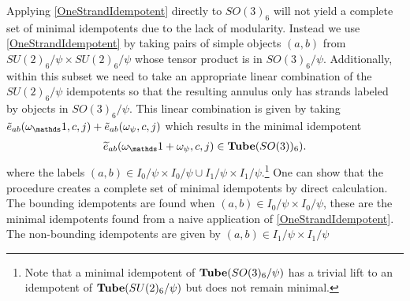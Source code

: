 Applying \eqref{OneStrandIdempotent} directly to $SO(3)_6$ will not yield a complete set of minimal idempotents due to the lack of modularity. 
Instead we use  \eqref{OneStrandIdempotent} by taking pairs of simple objects $(a,b)$ from $SU(2)_6/\psi \times SU(2)_6/\psi$ whose tensor product is in $SO(3)_6/\psi$.
Additionally, within this subset we need to take an appropriate linear combination of the $SU(2)_6/\psi$ idempotents so that the resulting annulus only has strands labeled by objects in $SO(3)_6/\psi$.
This linear combination is given by taking $\tilde{e}_{ab}(\omega_\unit, c,j)+\tilde{e}_{ab}(\omega_\psi, c,j)$ which results in the minimal idempotent
\begin{align}
\widetilde{e}_{ab}( \omega_\unit + \omega_\psi,c,j) \in \tube(SO(3))_6).
\end{align}
where the labels $(a,b) \in I_0/\psi \times I_0/\psi \cup I_1/\psi \times I_1/\psi$.\footnote{
Note that a minimal idempotent of 
$\textbf{Tube}(SO(3)_6/\psi)$ has a trivial lift to an idempotent of $\textbf{Tube}(SU(2)_6/\psi)$ but does not remain minimal.}
One can show that the procedure creates a complete set of minimal idempotents by direct calculation. 
The bounding idempotents are found when $(a,b) \in I_0/\psi \times I_0/\psi$, 
these are the minimal idempotents found from a naive application of \eqref{OneStrandIdempotent}. 
The non-bounding idempotents are given by $(a,b) \in I_1/\psi \times I_1/\psi$



